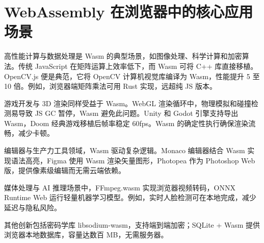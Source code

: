 \chapter{WebAssembly 在浏览器中的核心应用场景}
高性能计算与数据处理是 Wasm 的典型场景，如图像处理、科学计算和加密算法。传统 JavaScript 在矩阵运算上效率低下，而 Wasm 可将 C++ 库直接移植。OpenCV.js 便是典范，它将 OpenCV 计算机视觉库编译为 Wasm，性能提升 5 至 10 倍。例如，浏览器端矩阵乘法可用 Rust 实现，远超纯 JS 版本。\par
游戏开发与 3D 渲染同样受益于 Wasm。WebGL 渲染循环中，物理模拟和碰撞检测易导致 JS GC 暂停，Wasm 避免此问题。Unity 和 Godot 引擎支持导出 Wasm，Doom 经典游戏移植后帧率稳定 60fps。Wasm 的确定性执行确保渲染流畅，减少卡顿。\par
编辑器与生产力工具领域，Wasm 驱动复杂逻辑。Monaco 编辑器结合 Wasm 实现语法高亮，Figma 使用 Wasm 渲染矢量图形，Photopea 作为 Photoshop Web 版，提供像素级编辑而无需云端依赖。\par
媒体处理与 AI 推理场景中，FFmpeg.wasm 实现浏览器视频转码，ONNX Runtime Web 运行轻量机器学习模型。例如，实时人脸检测可在本地完成，减少延迟与隐私风险。\par
其他创新包括密码学库 libsodium-wasm，支持端到端加密；SQLite + Wasm 提供浏览器本地数据库，容量达数百 MB，无需服务器。\par
